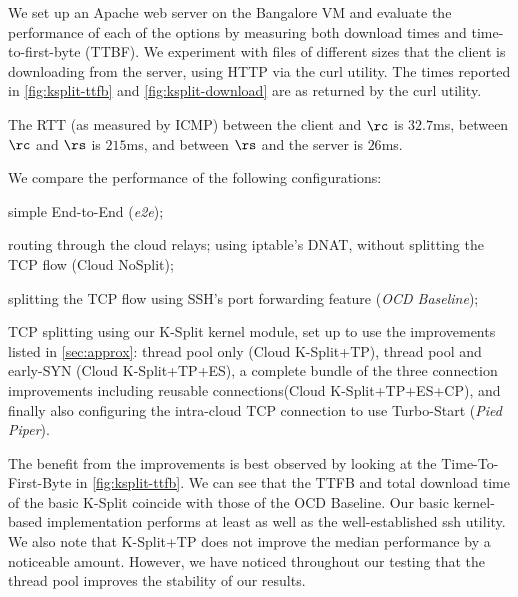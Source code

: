 \documentclass[newfonts=false,format=sigconf,10pt,letterpaper]{acmart}
\newcommand{\name}{Pied Piper\xspace}
\newcommand{\ksplit}{K-Split\xspace}
\newcommand{\reconn}{reusable connections\xspace}
\begin{document}
We set up an Apache web server on the Bangalore VM and evaluate the performance of each of the options by measuring both download times and time-to-first-byte (TTBF). We experiment with files of different sizes that the client is downloading from the server, using HTTP via the curl utility. The times reported in \autoref{fig:ksplit-ttfb} and \autoref{fig:ksplit-download}  are as returned by the curl utility. 

The RTT  (as measured by ICMP) between the client and $\rc$ is $32.7$ms, between $\rc$ and $\rs$ is $215$ms, and between $\rs$ and the server is $26$ms.

We compare the performance of the following configurations: \begin{romanlist}
     \item simple End-to-End (\textit{e2e});
     \item routing through the cloud relays; using iptable's DNAT, without splitting the TCP flow (Cloud NoSplit);
     \item splitting the TCP flow using SSH's port forwarding feature (\textit{OCD Baseline});
     \item TCP splitting using our \ksplit kernel module, set up to use the improvements listed in \autoref{sec:approx}: thread pool only (Cloud \ksplit+TP), thread pool and early-SYN (Cloud \ksplit+TP+ES), a complete bundle of the three connection improvements including \reconn (Cloud \ksplit+TP+ES+CP), and finally also configuring the intra-cloud TCP connection to use Turbo-Start (\textit{\name}).
\end{romanlist}

The benefit from the improvements is best observed by looking at the Time-To-First-Byte in \autoref{fig:ksplit-ttfb}. We can see that the  TTFB and total download time of the basic \ksplit coincide with those of the OCD Baseline. Our basic kernel-based implementation performs at least as well as the well-established ssh utility. We also note that \ksplit+TP does not improve the median performance by a noticeable amount. However, we have noticed throughout our testing that the thread pool improves the stability of our results.
\end{document}
